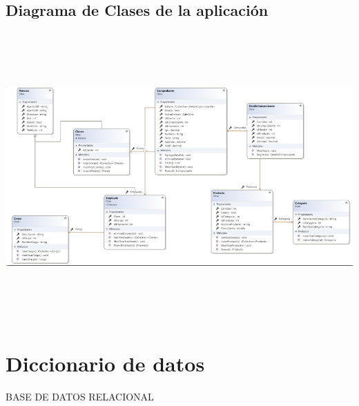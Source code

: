 \documentclass[12pt,letterpaper]{article}
\begin{document}
\subsection{Diagrama de Clases de la aplicación}

\begin{center}
    \includegraphics[width=18cm, height=11cm]{img/casos2.png}  
\end{center}

\section{Diccionario de datos}

BASE DE DATOS RELACIONAL\\
\end{document}
